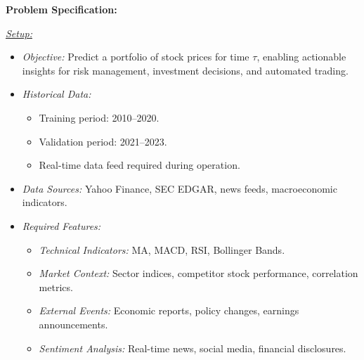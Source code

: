 \noindent \textbf{Problem Specification:}

\noindent \underline{\textit{Setup:}}
\begin{itemize}[leftmargin=1.2em, topsep=-.0em, parsep=-.0em, label=*]
   \item \textit{Objective:} Predict a portfolio of stock prices for time \(\tau\), enabling actionable insights for risk management, investment decisions, and automated trading.
   \item \textit{Historical Data:}
   \begin{itemize}[leftmargin=1em, topsep=-.1em, parsep=-.1em]
       \item Training period: 2010--2020.
       \item Validation period: 2021--2023.
       \item Real-time data feed required during operation.
   \end{itemize}
   \item \textit{Data Sources:} Yahoo Finance, SEC EDGAR, news feeds, macroeconomic indicators.
   \item \textit{Required Features:}
   \begin{itemize}[leftmargin=1em, topsep=-.1em, parsep=-.1em]
       \item \textit{Technical Indicators:} MA, MACD, RSI, Bollinger Bands.
       \item \textit{Market Context:} Sector indices, competitor stock performance, correlation metrics.
       \item \textit{External Events:} Economic reports, policy changes, earnings announcements.
       \item \textit{Sentiment Analysis:} Real-time news, social media, financial disclosures.
   \end{itemize}
\end{itemize}

